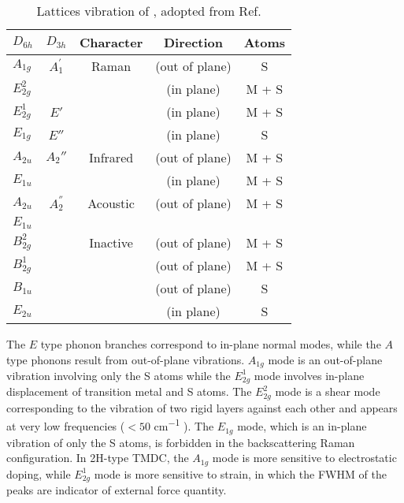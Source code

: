 \begin{table}[htb]
\centering
\caption[Lattices vibration of ]{Lattices vibration of , adopted from Ref.\cite{Molina-Sanchez2011}}\label{tab:tmslattice}
\begin{tabular}{lcccc}
\toprule
 $D_{6h}$   & $D_{3h}$ & Character &  Direction & Atoms  \\
\midrule
$A_{1g}$    &  $A_1^{'}$   & Raman     & (out of plane)  & S  \\
$E_{2g}^2$  &          &           & (in plane)      & M + S  \\
$E_{2g}^1$  &  $E'$    &           & (in plane)      & M + S  \\
$E_{1g}$    &  $E''$    &           & (in plane)      & S  \\
\midrule
$A_{2u}$    &  $A_2''$  & Infrared  & (out of plane)  & M + S  \\
$E_{1u}$    &          &           & (in plane)      & M + S  \\
\midrule
$A_{2u}$    &  $A_2^{''}$   & Acoustic  & (out of plane)  & M + S  \\
$E_{1u}$    &          &           &       &    \\
\midrule
$B_{2g}^2$  &          & Inactive  & (out of plane)  & M + S  \\
$B_{2g}^1$  &          &           & (out of plane)  & M + S  \\
$B_{1u}$    &          &           & (out of plane)  & S  \\
$E_{2u}$    &          &           & (in plane)      & S  \\
\bottomrule
\end{tabular}
\end{table}
The $E$ type phonon branches correspond to in-plane normal modes, while the $A$ type phonons result from out-of-plane vibrations. $A_{1g}$ mode is an out-of-plane vibration involving only the S atoms while the $E_{2g}^1$ mode involves in-plane displacement of transition metal and S atoms. The $E_{2g}^2$ mode is a shear mode corresponding to the vibration of two rigid layers against
each other and appears at very low frequencies ($<50$ \si{cm^{-1}} \cite{Zhang2013e}). The $E_{1g}$ mode, which is an in-plane vibration of only the S atoms, is forbidden in the backscattering Raman configuration. In 2H-type TMDC, the $A_{1g}$ mode is more sensitive to electrostatic doping, while $E_{2g}^1$ mode is more sensitive to strain, in which the FWHM of the peaks are indicator of external force quantity.\cite{Zhao2013}

